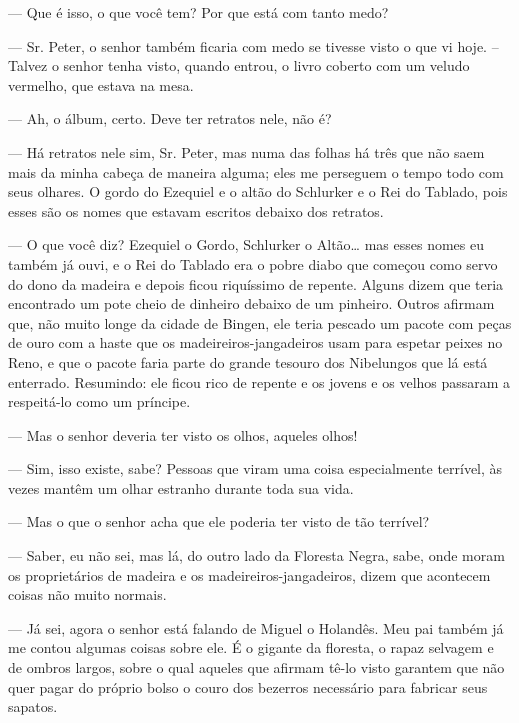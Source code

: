 \begin{myparindent}{0pt}
\begin{Parskip}
 --- Que é isso, o que você tem? Por que está com
tanto medo?

 --- Sr. Peter, o senhor também ficaria com medo se
tivesse visto o que vi hoje. -- Talvez o senhor tenha visto, quando
entrou, o livro coberto com um veludo vermelho, que estava na mesa.

 --- Ah, o álbum, certo. Deve ter retratos nele, não
é?

 --- Há retratos nele sim, Sr. Peter, mas numa das
folhas há três que não saem mais da minha cabeça de maneira alguma; eles
me perseguem o tempo todo com seus olhares. O gordo do Ezequiel e o
altão do Schlurker e o Rei do Tablado, pois esses são os nomes que
estavam escritos debaixo dos retratos.

 --- O que você diz? Ezequiel o Gordo, Schlurker o
Altão\ldots{} mas esses nomes eu também já ouvi, e o Rei do Tablado era o
pobre diabo que começou como servo do dono da madeira e depois ficou
riquíssimo de repente. Alguns dizem que teria encontrado um pote cheio
de dinheiro debaixo de um pinheiro. Outros afirmam que, não muito longe
da cidade de Bingen, ele teria pescado um pacote com peças de ouro com a
haste que os madeireiros-jangadeiros usam para espetar peixes no Reno, e
que o pacote faria parte do grande tesouro dos Nibelungos que lá está
enterrado. Resumindo: ele ficou rico de repente e os jovens e os velhos
passaram a respeitá-lo como um príncipe.

 --- Mas o senhor deveria ter visto os olhos, aqueles
olhos!

 --- Sim, isso existe, sabe? Pessoas que viram uma
coisa especialmente terrível, às vezes mantêm um olhar estranho durante
toda sua vida.

 --- Mas o que o senhor acha que ele poderia ter visto
de tão terrível?

 --- Saber, eu não sei, mas lá, do outro lado da
Floresta Negra, sabe, onde moram os proprietários de madeira e os
madeireiros-jangadeiros, dizem que acontecem coisas não muito normais.

 --- Já sei, agora o senhor está falando de Miguel o
Holandês. Meu pai também já me contou algumas coisas sobre ele. É o
gigante da floresta, o rapaz selvagem e de ombros largos, sobre o qual
aqueles que afirmam tê-lo visto garantem que não quer pagar do próprio
bolso o couro dos bezerros necessário para fabricar seus sapatos.


\end{Parskip}
\end{myparindent}
